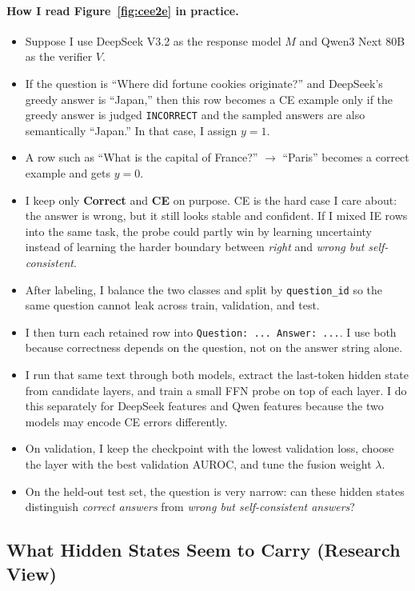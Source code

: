\documentclass[11pt]{article}
\begin{document}
\paragraph{How I read Figure~\ref{fig:cee2e} in practice.}
\begin{itemize}
    \item Suppose I use DeepSeek V3.2 as the response model $M$ and Qwen3 Next 80B as the verifier $V$.
    \item If the question is ``Where did fortune cookies originate?'' and DeepSeek's greedy answer is ``Japan,'' then this row becomes a CE example only if the greedy answer is judged \texttt{INCORRECT} and the sampled answers are also semantically ``Japan.'' In that case, I assign $y=1$.
    \item A row such as ``What is the capital of France?'' $\rightarrow$ ``Paris'' becomes a correct example and gets $y=0$.
    \item I keep only \textbf{Correct} and \textbf{CE} on purpose. CE is the hard case I care about: the answer is wrong, but it still looks stable and confident. If I mixed IE rows into the same task, the probe could partly win by learning uncertainty instead of learning the harder boundary between \emph{right} and \emph{wrong but self-consistent}.
    \item After labeling, I balance the two classes and split by \texttt{question\_id} so the same question cannot leak across train, validation, and test.
    \item I then turn each retained row into \texttt{Question: ... Answer: ...}. I use both because correctness depends on the question, not on the answer string alone.
    \item I run that same text through both models, extract the last-token hidden state from candidate layers, and train a small FFN probe on top of each layer. I do this separately for DeepSeek features and Qwen features because the two models may encode CE errors differently.
    \item On validation, I keep the checkpoint with the lowest validation loss, choose the layer with the best validation AUROC, and tune the fusion weight $\lambda$.
    \item On the held-out test set, the question is very narrow: can these hidden states distinguish \emph{correct answers} from \emph{wrong but self-consistent answers}?
\end{itemize}

\subsection{What Hidden States Seem to Carry (Research View)}
\end{document}
